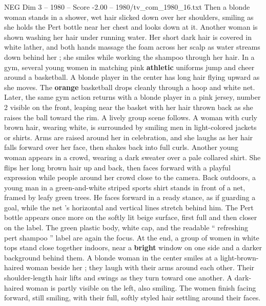 \begin{textsample}{NEG Dim 3 – 1980 – Score -2.00 – 1980/tv\_com\_1980\_16.txt}
Then a blonde woman stands in a shower, wet hair slicked down over her shoulders, smiling as she holds the Pert bottle near her chest and looks down at it.
Another woman is shown washing her hair under running water.
Her short dark hair is covered in white lather, and both hands massage the foam across her scalp as water streams down behind her ; she smiles while working the shampoo through her hair.
In a gym, several young women in matching pink \textbf{athletic} uniforms jump and cheer around a basketball.
A blonde player in the center has long hair flying upward as she moves.
The \textbf{orange} basketball drops cleanly through a hoop and white net.
Later, the same gym action returns with a blonde player in a pink jersey, number 2 visible on the front, leaping near the basket with her hair thrown back as she raises the ball toward the rim.
A lively group scene follows.
A woman with curly brown hair, wearing white, is surrounded by smiling men in light-colored jackets or shirts.
Arms are raised around her in celebration, and she laughs as her hair falls forward over her face, then shakes back into full curls.
Another young woman appears in a crowd, wearing a dark sweater over a pale collared shirt.
She flips her long brown hair up and back, then faces forward with a playful expression while people around her crowd close to the camera.
Back outdoors, a young man in a green-and-white striped sports shirt stands in front of a net, framed by leafy green trees.
He faces forward in a ready stance, as if guarding a goal, while the net ’s horizontal and vertical lines stretch behind him.
The Pert bottle appears once more on the softly lit beige surface, first full and then closer on the label.
The green plastic body, white cap, and the readable “ refreshing pert shampoo ” label are again the focus.
At the end, a group of women in white tops stand close together indoors, near a \textbf{bright} window on one side and a darker background behind them.
A blonde woman in the center smiles at a light-brown-haired woman beside her ; they laugh with their arms around each other.
Their shoulder-length hair lifts and swings as they turn toward one another.
A dark-haired woman is partly visible on the left, also smiling.
The women finish facing forward, still smiling, with their full, softly styled hair settling around their faces.

\end{textsample}

